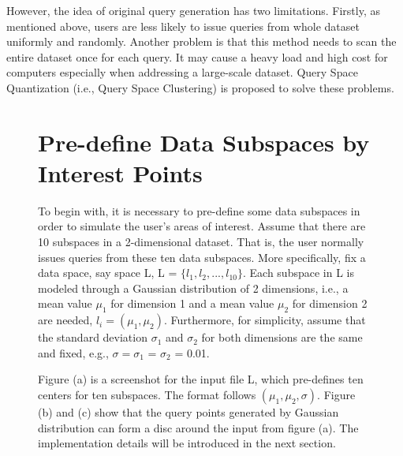 \documentclass{lmproj}
\begin{document}
However, the idea of original query generation has two limitations. Firstly, as mentioned above, users are less likely to issue queries from whole dataset uniformly and randomly. Another problem is that this method needs to scan the entire dataset once for each query. It may cause a heavy load and high cost for computers especially when addressing a large-scale dataset. Query Space Quantization (i.e., Query Space Clustering) is proposed to solve these problems. 

\begin{figure}
\section{Pre-define Data Subspaces by Interest Points}
To begin with, it is necessary to pre-define some data subspaces in order to simulate the user's areas of interest. Assume that there are 10 subspaces in a 2-dimensional dataset. That is, the user normally issues queries from these ten data subspaces. More specifically, fix a data space, say space L, L = $ \{l_1,l_2, ..., l_{10}\} $. Each subspace in L is modeled through a Gaussian distribution of 2 dimensions, i.e., a mean value $ \mu_1 $ for dimension 1 and a mean value $ \mu_2 $  for dimension 2 are needed, $ l_i= (\mu_1,\mu_2) $. Furthermore, for simplicity, assume that the standard deviation  $ \sigma_1 $  and $ \sigma_2 $ for both dimensions are the same and fixed, e.g., $ \sigma = \sigma_1 $ = $ \sigma_2 $ = 0.01. 


Figure (a) is a screenshot for the input file L, which pre-defines ten centers for ten subspaces. The format follows $ (\mu_1,\mu_2,\sigma) $. Figure (b) and (c) show that the query points generated by Gaussian distribution can form a disc around the input from figure (a). The implementation details will be introduced in the next section.
\end{figure}
\end{document}
